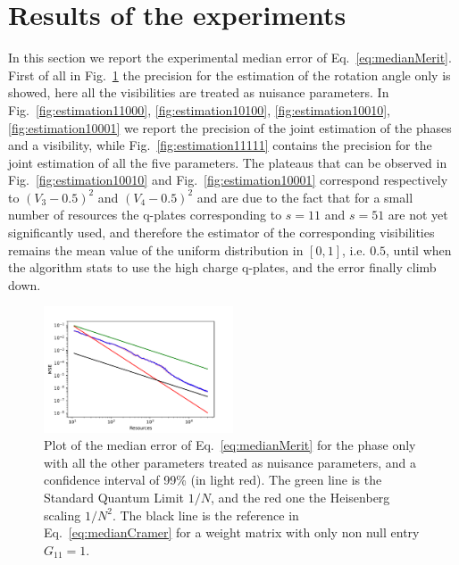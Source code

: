 \documentclass[aps, pra, 10pt, twocolumn, superscriptaddress,floatfix]{revtex4-1}
\begin{document}
\section{Results of the experiments}
\label{sec:results}
%
In this section we report the experimental median error of Eq.~\eqref{eq:medianMerit}. First of all in Fig.~\ref{fig:estimation10000} the precision for the estimation of the rotation angle only is showed, here all the visibilities are treated as nuisance parameters. In Fig.~\ref{fig:estimation11000}, \ref{fig:estimation10100}, \ref{fig:estimation10010}, \ref{fig:estimation10001} we report the precision of the joint estimation of the phases and a visibility, while Fig.~\ref{fig:estimation11111} contains the precision for the joint estimation of all the five parameters. The plateaus that can be observed in Fig.~\ref{fig:estimation10010} and Fig.~\ref{fig:estimation10001} correspond respectively to $(V_3-0.5)^2$ and $(V_4-0.5)^2$ and are due to the fact that for a small number of resources the q-plates corresponding to $s=11$ and $s=51$ are not yet significantly used, and therefore the estimator of the corresponding visibilities remains the mean value of the uniform distribution in $[0, 1]$, i.e. $0.5$, until when the algorithm stats to use the high charge q-plates, and the error finally climb down.
%
\begin{figure}[!th]
	\begin{center}
		\includegraphics[width=0.5\textwidth]{phaseAndVisibilities/estimation1000010000.pdf}
	\end{center}
	\caption{Plot of the median error of Eq.~\eqref{eq:medianMerit} for the phase only with all the other parameters treated as nuisance parameters, and a confidence interval of 99\% (in light red). The green line is the Standard Quantum Limit $1/N$, and the red one the Heisenberg scaling $1/N^2$. The black line is the reference in Eq.~\eqref{eq:medianCramer} for a weight matrix with only non null entry $G_{11} = 1$.}
	\label{fig:estimation10000}
\end{figure}
%
\end{document}
